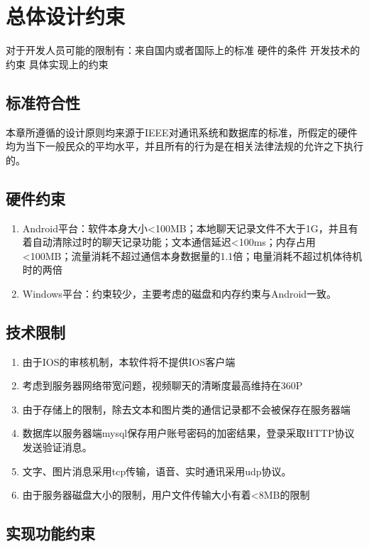 \chapter{总体设计约束}


对于开发人员可能的限制有：来自国内或者国际上的标准
硬件的条件
开发技术的约束
具体实现上的约束
 
\section{标准符合性}


本章所遵循的设计原则均来源于IEEE对通讯系统和数据库的标准，所假定的硬件均为当下一般民众的平均水平，并且所有的行为是在相关法律法规的允许之下执行的。


\section{硬件约束}

\begin{enumerate}
	\item Android平台：软件本身大小<100MB；本地聊天记录文件不大于1G，并且有着自动清除过时的聊天记录功能；文本通信延迟<100ms；内存占用<100MB；流量消耗不超过通信本身数据量的1.1倍；电量消耗不超过机体待机时的两倍
	\item Windows平台：约束较少，主要考虑的磁盘和内存约束与Android一致。
\end{enumerate}

\section{技术限制}

\begin{enumerate}
	\item 由于IOS的审核机制，本软件将不提供IOS客户端
	\item 考虑到服务器网络带宽问题，视频聊天的清晰度最高维持在360P
	\item 
	由于存储上的限制，除去文本和图片类的通信记录都不会被保存在服务器端
	\item 数据库以服务器端mysql保存用户账号密码的加密结果，登录采取HTTP协议发送验证消息。
	\item 文字、图片消息采用tcp传输，语音、实时通讯采用udp协议。
	\item 
	由于服务器磁盘大小的限制，用户文件传输大小有着<8MB的限制
	
\end{enumerate}

\section{实现功能约束}
